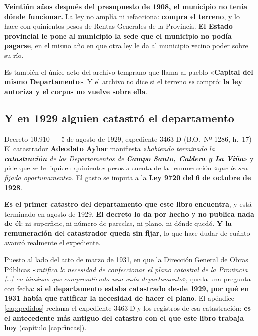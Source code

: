 \begin{cautela}
\textbf{Veintiún años después del presupuesto de 1908, el municipio no tenía dónde funcionar.} La
ley no amplía ni refacciona: \textbf{compra el terreno}, y lo hace con quinientos pesos de Rentas
Generales de la Provincia. \textbf{El Estado provincial le pone al municipio la sede que el
municipio no podía pagarse}, en el mismo año en que otra ley le da al municipio vecino poder sobre
su río.

Es también el único acto del archivo temprano que llama al pueblo «\textbf{Capital del mismo
Departamento}». Y el archivo no dice si el terreno se compró: \textbf{la ley autoriza y el corpus
no vuelve sobre ella}.
\end{cautela}

\subsection*{Y en 1929 alguien catastró el departamento}

\begin{ficha}{Decreto 10.910 --- 5 de agosto de 1929, expediente 3463 D (B.O.\ Nº 1286, h.\ 17)}
El catastrador \textbf{Adeodato Aybar} manifiesta «\textit{habiendo terminado la
\textbf{catastración} de los Departamentos de \textbf{Campo Santo, Caldera y La Viña}}» y pide que
se le liquiden quinientos pesos a cuenta de la remuneración «\textit{que le sea fijada
oportunamente}». El gasto se imputa a la \textbf{Ley 9720 del 6 de octubre de 1928}.
\end{ficha}

\begin{cautela}
\textbf{Es el primer catastro del departamento que este libro encuentra}, y está terminado en
agosto de 1929. \textbf{El decreto lo da por hecho y no publica nada de él}: ni superficie, ni
número de parcelas, ni plano, ni dónde quedó. \textbf{Y la remuneración del catastrador queda sin
fijar}, lo que hace dudar de cuánto avanzó realmente el expediente.

Puesto al lado del acto de marzo de 1931, en que la Dirección General de Obras Públicas
«\textit{ratifica la necesidad de confeccionar el plano catastral de la Provincia [\ldots] en
láminas que comprendiendo una cada departamento}», queda una pregunta con fecha: \textbf{si el
departamento estaba catastrado desde 1929, por qué en 1931 había que ratificar la necesidad de
hacer el plano}. El apéndice \ref{cap:pedidos} reclama el expediente 3463 D y los registros de esa
catastración: \textbf{es el antecedente más antiguo del catastro con el que este libro trabaja hoy}
(capítulo \ref{cap:fincas}).
\end{cautela}

